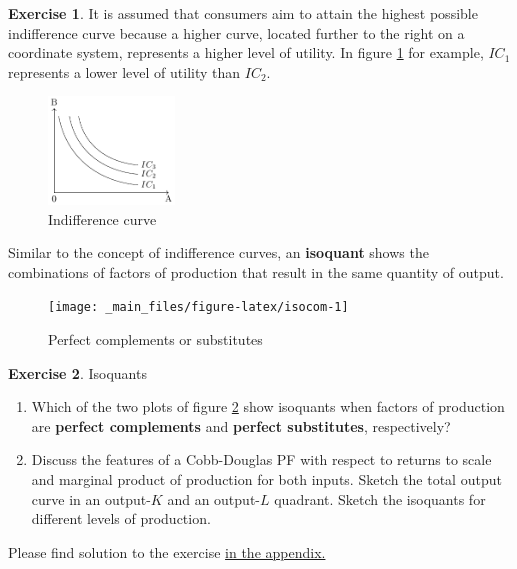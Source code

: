 \documentclass[
  12pt,
  oneside]{book}
\theoremstyle{definition}
\theoremstyle{definition}
\theoremstyle{definition}
\newtheorem{exercise}{Exercise}[chapter]
\theoremstyle{definition}
\theoremstyle{remark}
\begin{document}
\begin{exercise}
It is assumed that consumers aim to attain the highest possible indifference curve because a higher curve, located further to the right on a coordinate system, represents a higher level of utility. In figure \ref{fig:ic2} for example, \(IC_1\) represents a lower level of utility than \(IC_2\).

\begin{figure}
\centering
\includegraphics[width=0.3\textwidth,height=\textheight]{fig/ic2.png}
\caption{\label{fig:ic2} Indifference curve}
\end{figure}

Similar to the concept of indifference curves, an \textbf{isoquant} shows the combinations of factors of production that result in the same quantity of output.
\end{exercise}

\begin{figure}

{\centering \texttt{[image: \_main\_files/figure-latex/isocom-1]} 

}

\caption{Perfect complements or substitutes}\label{fig:isocom}
\end{figure}

\begin{exercise}
\protect\hypertarget{exr:isoquants}{}\label{exr:isoquants}Isoquants

\begin{enumerate}
\def\labelenumi{\alph{enumi})}
\item
  Which of the two plots of figure \ref{fig:isocom} show isoquants when factors of production are \textbf{perfect complements} and \textbf{perfect substitutes}, respectively?
\item
  Discuss the features of a Cobb-Douglas PF with respect to returns to scale and marginal product of production for both inputs. Sketch the total output curve in an output-\(K\) and an output-\(L\) quadrant. Sketch the isoquants for different levels of production.
\end{enumerate}

Please find solution to the exercise \hyperref[sol:isoquants]{in the appendix.}
\end{exercise}
\end{document}

